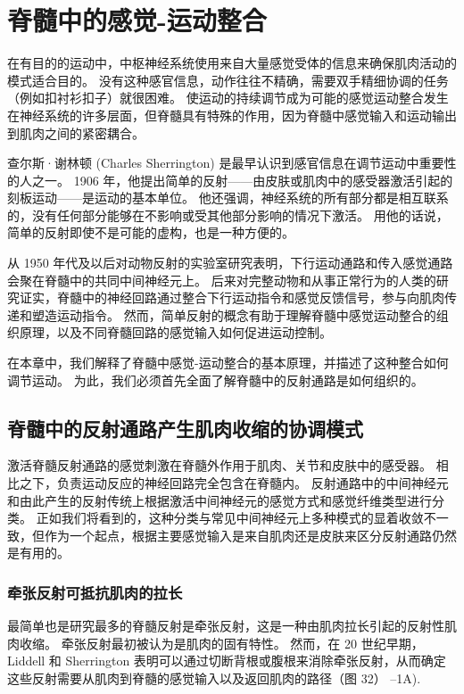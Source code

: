 \chapter{脊髓中的感觉-运动整合}
在有目的的运动中，中枢神经系统使用来自大量感觉受体的信息来确保肌肉活动的模式适合目的。 没有这种感官信息，动作往往不精确，需要双手精细协调的任务（例如扣衬衫扣子）就很困难。 使运动的持续调节成为可能的感觉运动整合发生在神经系统的许多层面，但脊髓具有特殊的作用，因为脊髓中感觉输入和运动输出到肌肉之间的紧密耦合。

查尔斯·谢林顿 (Charles Sherrington) 是最早认识到感官信息在调节运动中重要性的人之一。 1906 年，他提出简单的反射——由皮肤或肌肉中的感受器激活引起的刻板运动——是运动的基本单位。 他还强调，神经系统的所有部分都是相互联系的，没有任何部分能够在不影响或受其他部分影响的情况下激活。 用他的话说，简单的反射即使不是可能的虚构，也是一种方便的。

从 1950 年代及以后对动物反射的实验室研究表明，下行运动通路和传入感觉通路会聚在脊髓中的共同中间神经元上。 后来对完整动物和从事正常行为的人类的研究证实，脊髓中的神经回路通过整合下行运动指令和感觉反馈信号，参与向肌肉传递和塑造运动指令。 然而，简单反射的概念有助于理解脊髓中感觉运动整合的组织原理，以及不同脊髓回路的感觉输入如何促进运动控制。

在本章中，我们解释了脊髓中感觉-运动整合的基本原理，并描述了这种整合如何调节运动。 为此，我们必须首先全面了解脊髓中的反射通路是如何组织的。

\section{脊髓中的反射通路产生肌肉收缩的协调模式}
激活脊髓反射通路的感觉刺激在脊髓外作用于肌肉、关节和皮肤中的感受器。 相比之下，负责运动反应的神经回路完全包含在脊髓内。 反射通路中的中间神经元和由此产生的反射传统上根据激活中间神经元的感觉方式和感觉纤维类型进行分类。 正如我们将看到的，这种分类与常见中间神经元上多种模式的显着收敛不一致，但作为一个起点，根据主要感觉输入是来自肌肉还是皮肤来区分反射通路仍然是有用的。

\subsection{牵张反射可抵抗肌肉的拉长}

最简单也是研究最多的脊髓反射是牵张反射，这是一种由肌肉拉长引起的反射性肌肉收缩。 牵张反射最初被认为是肌肉的固有特性。 然而，在 20 世纪早期，Liddell 和 Sherrington 表明可以通过切断背根或腹根来消除牵张反射，从而确定这些反射需要从肌肉到脊髓的感觉输入以及返回肌肉的路径（图 32） –1A).

